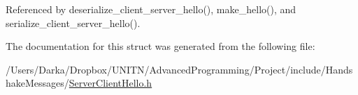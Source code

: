 Referenced by deserialize\+\_\+client\+\_\+server\+\_\+hello(), make\+\_\+hello(), and serialize\+\_\+client\+\_\+server\+\_\+hello().



The documentation for this struct was generated from the following file\+:\begin{DoxyCompactItemize}
\item 
/\+Users/\+Darka/\+Dropbox/\+U\+N\+I\+T\+N/\+Advanced\+Programming/\+Project/include/\+Handshake\+Messages/\hyperlink{_server_client_hello_8h}{Server\+Client\+Hello.\+h}\end{DoxyCompactItemize}
